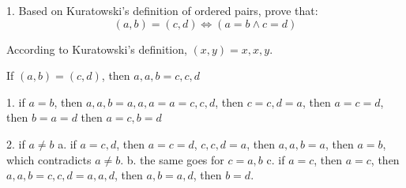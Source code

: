 \documentclass{article}
\begin{document}
1. Based on Kuratowski's definition of ordered pairs, prove that:
$$
(a, b) = (c, d) \iff (a = b \land c = d)
$$

According to Kuratowski's definition, $(x, y) = {{x}, {x, y}}$.

If $(a, b) = (c, d)$, then ${{a}, {a, b}} = {{c}, {c, d}}$

  1. if $a = b$,
     then ${{a}, {a, b}} = {{a}, {a, a}} = {{a}} = {{c}, {c, d}}$,
     then ${c} = {c, d} = {a}$,
     then $a = c = d$,
     then $b = a = d$
     then $a = c, b = d$

  2. if $a \neq b$
     a. if ${a} = {c, d}$,
        then $a = c = d$, ${{c}, {c, d}} = {{a}}$,
        then ${{a}, {a, b}} = {{a}}$,
        then $a = b$,
        which contradicts $a \neq b$.
     b. the same goes for ${c} = {a, b}$
     c. if ${a} = {c}$,
        then $a = c$,
        then ${{a}, {a, b}} = {{c}, {c, d}} = {{a}, {a, d}}$,
        then ${a, b} = {a, d}$,
        then $b = d$.
\end{document}
